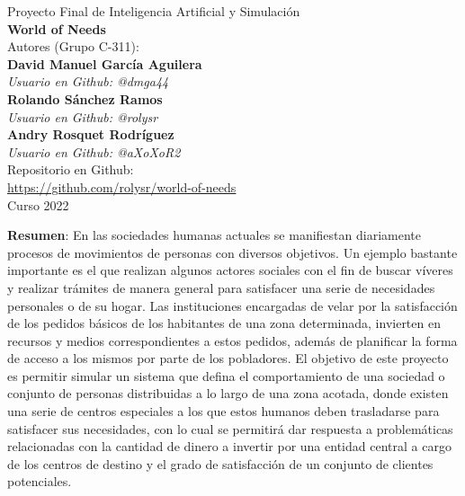 \documentclass[12pt]{amsart}
\begin{document}
\begin{center}
    {\large Proyecto Final de Inteligencia Artificial y Simulación}  \\ 
	 \vspace{0.5cm}  
    \vskip 0.1cm
    {\LARGE \textbf{World of Needs}} \\
    \vskip 2cm
    {\Large Autores (Grupo C-311):}\\ 
    \vspace{0.5cm} 
    		{\Large\textbf{David Manuel García Aguilera}} \\
    		{\normalsize\textit{Usuario en Github: @dmga44}}\\
 			{\Large\textbf{Rolando Sánchez Ramos}}\\
 			{\normalsize\textit{Usuario en Github: @rolysr}}\\
			{\Large\textbf{Andry Rosquet Rodríguez}}\\
 			{\normalsize\textit{Usuario en Github: @aXoXoR2}}\\
	 \vspace{1cm}
	{\Large Repositorio en Github:}\\
	{\url{https://github.com/rolysr/world-of-needs}}\\  
 	\vspace{0.5cm}
	{\large Curso 2022}  \\ 
	 \vspace{0.5cm}   
  \vskip 20cm
  
  \Large \textbf{Resumen}:
    En las sociedades humanas actuales se manifiestan diariamente procesos de movimientos de personas con diversos objetivos. Un ejemplo bastante importante es el que realizan algunos actores sociales con el fin de buscar víveres y realizar trámites de manera general para satisfacer una serie de necesidades personales o de su hogar. Las instituciones encargadas de velar por la satisfacción de los pedidos básicos de los habitantes de una zona determinada, invierten en recursos y medios correspondientes a estos pedidos, además de planificar la forma de acceso a los mismos por parte de los pobladores. El objetivo de este proyecto es permitir simular un sistema que defina el comportamiento de una sociedad o conjunto de personas distribuidas a lo largo de una zona acotada, donde existen una serie de centros especiales a los que estos humanos deben trasladarse para satisfacer sus necesidades, con lo cual se permitirá dar respuesta a problemáticas relacionadas con la cantidad de dinero a invertir por una entidad central a cargo de los centros de destino y el grado de satisfacción de un conjunto de clientes potenciales.

  \end{center}
  
\end{document}
